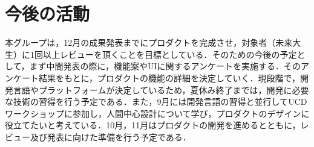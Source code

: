 \chapter{今後の活動}
本グループは，12月の成果発表までにプロダクトを完成させ，対象者（未来大生）に1回以上レビューを頂くことを目標としている．そのための今後の予定として，まず中間発表の際に，機能案やUIに関するアンケートを実施する．そのアンケート結果をもとに，プロダクトの機能の詳細を決定していく．現段階で，開発言語やプラットフォームが決定しているため，夏休み終了までは，開発に必要な技術の習得を行う予定である．また，9月には開発言語の習得と並行してUCDワークショップに参加し，人間中心設計について学び，プロダクトのデザインに役立てたいと考えている．10月，11月はプロダクトの開発を進めるとともに，レビュー及び発表に向けた準備を行う予定である．

